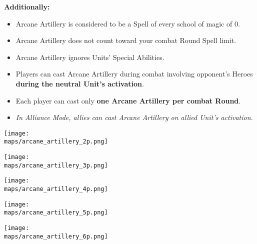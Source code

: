 \begin{multicols}{2}
\textbf{Additionally:}

\begin{itemize}
  \item Arcane Artillery is considered to be a Spell of every school of magic of  0.
  \item Arcane Artillery does not count toward your combat Round Spell limit.
  \item Arcane Artillery ignores Units' Special Abilities.
  \item Players can cast Arcane Artillery during combat involving opponent's Heroes \textbf{during the neutral Unit's activation}.
  \item Each player can cast only \textbf{one Arcane Artillery per combat Round}.
  \item \textit{In Alliance Mode, allies can cast Arcane Artillery on allied Unit's activation.}
\end{itemize}

\end{multicols}

\newpage

  \begin{minipage}{0.4\paperwidth}
    \centering
    \texttt{[image: \\maps/arcane\_artillery\_2p.png]}
  \end{minipage}
  \vspace{1em}
  \linebreak
  \begin{minipage}{0.4\paperwidth}
    \centering
    \texttt{[image: \\maps/arcane\_artillery\_3p.png]}
  \end{minipage}
  \begin{minipage}{0.4\paperwidth}
    \centering
    \texttt{[image: \\maps/arcane\_artillery\_4p.png]}
  \end{minipage}
  \vspace{1em}
  \linebreak
  \begin{minipage}{0.4\paperwidth}
    \centering
    \texttt{[image: \\maps/arcane\_artillery\_5p.png]}
  \end{minipage}
  \begin{minipage}{0.4\paperwidth}
    \centering
    \texttt{[image: \\maps/arcane\_artillery\_6p.png]}
  \end{minipage}
